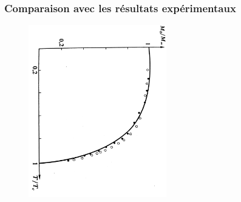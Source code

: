 \documentclass{beamer}
\begin{document}
\begin{frame}
\frametitle{Comparaison avec les résultats expérimentaux}
\begin{figure}
	\includegraphics[width=6cm, angle=90]{comparaison}
\end{figure}
\end{frame}
\end{document}
